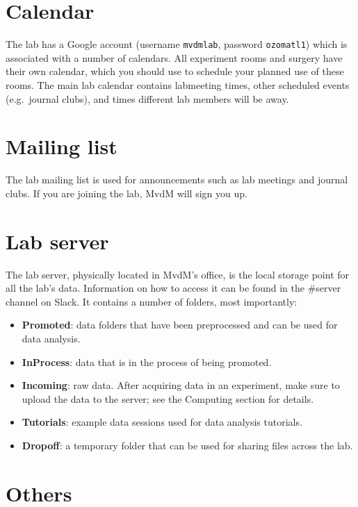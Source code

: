 \documentclass{tufte-book}
\newcommand{\doccls}[1]{\texttt{#1}}%
\begin{document}
\section{Calendar}

The lab has a Google account (username \doccls{mvdmlab}, password
\doccls{ozomatl1}) which is associated with a number of calendars. All
experiment rooms and surgery have their own calendar, which you should
use to schedule your planned use of these rooms. The main lab calendar
contains labmeeting times, other scheduled events (e.g.\ journal
clubs), and times different lab members will be away.

\section{Mailing list}

The lab mailing list is used for announcements such as lab meetings
and journal clubs. If you are joining the lab, MvdM will sign you up.

\section{Lab server}

The lab server, physically located in MvdM's office, is the local
storage point for all the lab's data. Information on how to access it
can be found in the \#server channel on Slack. It contains a number of
folders, most importantly:

\begin{itemize}
\item{{\bf Promoted}: data folders that have been
  preprocessed and can be used for data analysis.}
\item{{\bf InProcess}: data that is in the process of being promoted.}
\item{{\bf Incoming}: raw data. After acquiring data in an experiment,
  make sure to upload the data to the server; see the Computing
  section for details.}
\item{{\bf Tutorials}: example data sessions used for data analysis
  tutorials.}
\item{{\bf Dropoff}: a temporary folder that can be used for sharing
  files across the lab.}
\end{itemize}

\section{Others}
\end{document}
